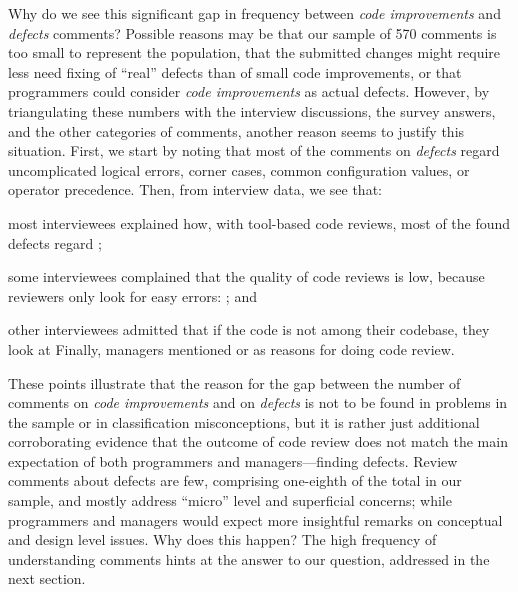 Why do we see this significant gap in frequency between \emph{code improvements} and \emph{defects} comments? Possible reasons may be that our sample of 570 comments is too small to represent the population, that the submitted changes might require less need fixing of ``real'' defects than of small code improvements, or that programmers could consider \emph{code improvements} as actual defects. However, by triangulating these numbers with the interview discussions, the survey answers, and the other categories of comments, another reason seems to justify this situation. First, we start by noting that most of the comments on \emph{defects} regard uncomplicated logical errors, \eg corner cases, common configuration values, or operator precedence. Then, from interview data, we see that: \begin{inparaenum}[(1)]
\item most interviewees explained how, with tool-based code reviews, most of the found defects regard ; 
\item some interviewees complained that the quality of code reviews is low, because reviewers only look for easy errors: ; and 
\item other interviewees admitted that if the code is not among their codebase, they look at  Finally, managers mentioned  or  as reasons for doing code review.
\end{inparaenum}
These points illustrate that the reason for the gap between the number of comments on \emph{code improvements} and on \emph{defects} is not to be found in problems in the sample or in classification misconceptions, but it is rather just additional corroborating evidence that the outcome of code review does not match the main expectation of both programmers and managers—finding defects. Review comments about defects are few, comprising one-eighth of the total in our sample, and mostly address ``micro'' level and superficial concerns; while programmers and managers would expect more insightful remarks on conceptual and design level issues. Why does this happen? The high frequency of understanding comments hints at the answer to our question, addressed in the next section.